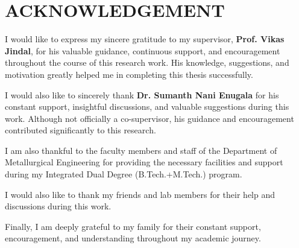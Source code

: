 \chapter*{\centering\normalsize ACKNOWLEDGEMENT}

I would like to express my sincere gratitude to my supervisor, \textbf{Prof. Vikas Jindal}, for his valuable guidance, continuous support, and encouragement throughout the course of this research work. His knowledge, suggestions, and motivation greatly helped me in completing this thesis successfully.

I would also like to sincerely thank \textbf{Dr. Sumanth Nani Enugala} for his constant support, insightful discussions, and valuable suggestions during this work. Although not officially a co-supervisor, his guidance and encouragement contributed significantly to this research.

I am also thankful to the faculty members and staff of the Department of Metallurgical Engineering for providing the necessary facilities and support during my Integrated Dual Degree (B.Tech.+M.Tech.) program.

I would also like to thank my friends and lab members for their help and discussions during this work.

Finally, I am deeply grateful to my family for their constant support, encouragement, and understanding throughout my academic journey.